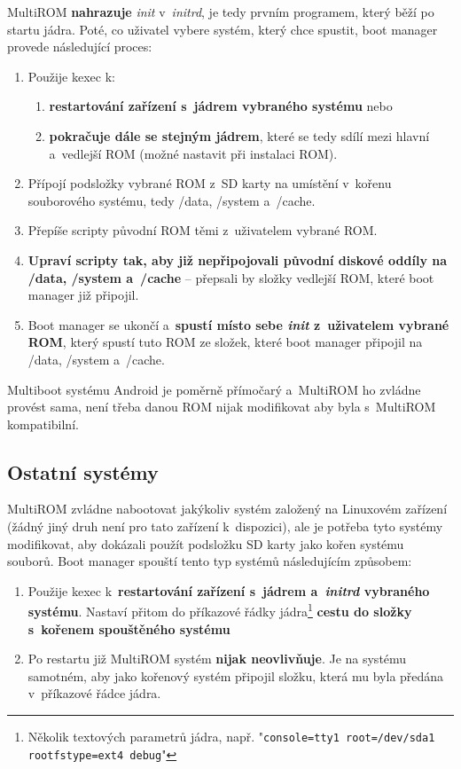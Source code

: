 \documentclass[12pt, a4paper, oneside]{article}
\newcommand{\B}{\textbf} %
\newcommand{\It}{\textit}  %
\begin{document}
MultiROM \B{nahrazuje} \It{init} v~\It{initrd}, je tedy prvním programem, který běží po startu jádra. Poté, co uživatel vybere systém, který chce spustit, boot manager provede následující proces:

\begin{enumerate}
    \item Použije kexec k:
    \begin{enumerate}
        \item \B{restartování zařízení s~jádrem vybraného systému} nebo
        \item \B{pokračuje dále se stejným jádrem}, které se tedy sdílí mezi hlavní a~vedlejší ROM (možné nastavit při instalaci ROM).
    \end{enumerate}
    \item Přípojí podsložky vybrané ROM z~SD karty na umístění v~kořenu souborového systému, tedy /data, /system a~/cache.
    \item Přepíše scripty původní ROM těmi z~uživatelem vybrané ROM.
    \item \B{Upraví scripty tak, aby již nepřipojovali původní diskové oddíly na /data, /system a~/cache} -- přepsali by složky vedlejší ROM, které boot manager již připojil.
    \item Boot manager se ukončí a~\B{spustí místo sebe \It{init} z~uživatelem vybrané ROM}, který spustí tuto ROM ze složek, které boot manager připojil na /data, /system a~/cache.
\end{enumerate}

Multiboot systému Android je poměrně přímočarý a~MultiROM ho zvládne provést sama, není třeba danou ROM nijak modifikovat aby byla s~MultiROM kompatibilní.

\subsection{Ostatní systémy}
MultiROM zvládne nabootovat jakýkoliv systém založený na Linuxovém zařízení (žádný jiný druh není pro tato zařízení k~dispozici), ale je potřeba tyto systémy modifikovat, aby dokázali použít podsložku SD karty jako kořen systému souborů. Boot manager spouští tento typ systémů následujícím způsobem:
\begin{enumerate}
    \item Použije kexec k~\B{restartování zařízení s~jádrem a~\It{initrd} vybraného systému}. Nastaví přitom do příkazové řádky jádra\footnote{Několik textových parametrů jádra, např. "\verb-console=tty1 root=/dev/sda1 rootfstype=ext4 debug-"} \B{cestu do složky s~kořenem spouštěného systému}
    \item Po restartu již MultiROM systém \B{nijak neovlivňuje}. Je na systému samotném, aby jako kořenový systém připojil složku, která mu byla předána v~příkazové řádce jádra.
\end{enumerate}
\end{document}
